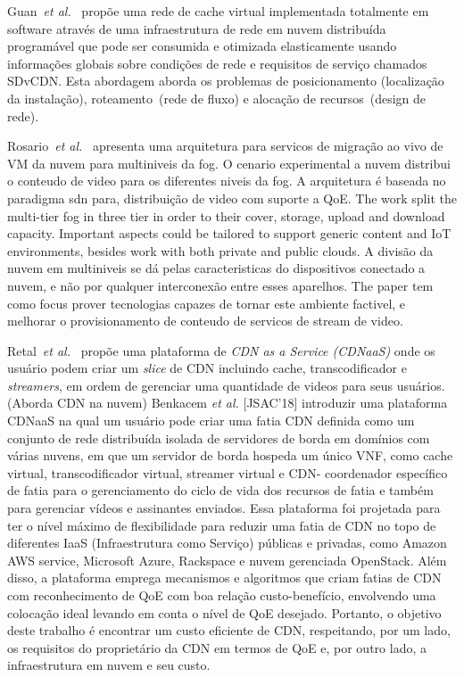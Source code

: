 Guan~\textit{et al.}~\cite{guan:2019:CLC} propõe uma rede de cache virtual implementada totalmente em software através de uma infraestrutura de rede em nuvem distribuída programável que pode ser consumida e otimizada elasticamente usando informações globais sobre condições de rede e requisitos de serviço chamados SDvCDN. Esta abordagem aborda os problemas de posicionamento (localização da instalação), roteamento~(rede de fluxo) e alocação de recursos~(design de rede).

Rosario~\textit{et al.}~\cite{rosarioSENSORS2018} apresenta uma arquitetura para servicos de migração ao vivo de VM da nuvem para multiniveis da fog. O cenario experimental a nuvem distribui o conteudo de video para os diferentes niveis da fog. A arquitetura é baseada no paradigma sdn para, distribuição de video com suporte a QoE. 
The work split the multi-tier fog in three tier in order to their cover, storage, upload and download capacity. Important aspects could be tailored to support generic content and IoT environments, besides work with both private and public clouds. A divisão da nuvem em multiniveis se dá pelas caracteristicas do  dispositivos conectado a nuvem, e não por qualquer interconexão entre esses aparelhos. The paper tem como focus prover tecnologias capazes de tornar este ambiente factivel, e melhorar o provisionamento de conteudo de servicos de stream de video.


Retal~\textit{et al.}~\cite{retalICC2017} propõe uma plataforma de \textit{CDN as a Service (CDNaaS)} onde os usuário podem criar um \textit{slice} de CDN incluindo cache, transcodificador e \textit{streamers}, em ordem de gerenciar uma quantidade de videos para seus usuários. (Aborda CDN na nuvem)
Benkacem \textit{et al.} [JSAC'18] introduzir uma plataforma CDNaaS na qual um usuário pode criar uma fatia CDN definida como um conjunto de rede distribuída isolada de servidores de borda em domínios com várias nuvens, em que um servidor de borda hospeda um único VNF, como cache virtual, transcodificador virtual, streamer virtual e CDN- coordenador específico de fatia para o gerenciamento do ciclo de vida dos recursos de fatia e também para gerenciar vídeos e assinantes enviados. Essa plataforma foi projetada para ter o nível máximo de flexibilidade para reduzir uma fatia de CDN no topo de diferentes IaaS (Infraestrutura como Serviço) públicas e privadas, como Amazon AWS service, Microsoft Azure, Rackspace e nuvem gerenciada OpenStack. Além disso, a plataforma emprega mecanismos e algoritmos que criam fatias de CDN com reconhecimento de QoE com boa relação custo-benefício, envolvendo uma colocação ideal levando em conta o nível de QoE desejado. Portanto, o objetivo deste trabalho é encontrar um custo eficiente de CDN, respeitando, por um lado, os requisitos do proprietário da CDN em termos de QoE e, por outro lado, a infraestrutura em nuvem e seu custo.

